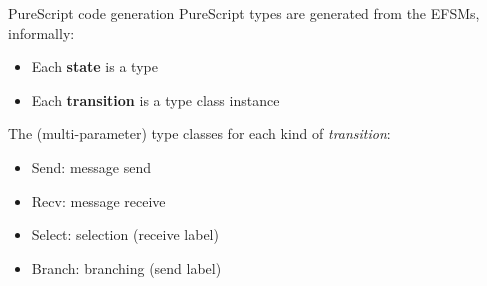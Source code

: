 \documentclass[aspectratio=1610]{beamer}
\begin{document}
\begin{frame}{PureScript code generation}
  PureScript types are generated from the EFSMs, informally:
  \begin{itemize}
    \item Each \textbf{state} is a type
    \item Each \textbf{transition} is a type class instance
  \end{itemize}

  The (multi-parameter) type classes for each kind of \textit{transition}:
  \begin{itemize}
    \item Send: message send
    \item Recv: message receive
    \item Select: selection (receive label)
    \item Branch: branching (send label)
  \end{itemize}
\end{frame}
\end{document}
